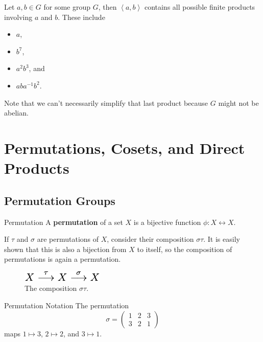 \documentclass[10pt]{report}
\begin{document}
\begin{ex}{}{}
	Let $a,b \in G$ for some group $G$, then $\left\langle a,b \right\rangle$ contains all possible finite products involving $a$ and $b$. These include
	\begin{itemize}
		\item $a$,
		\item $b^7$,
		\item $a^2 b^3$, and
		\item $a b a^{-1} b^2$.
	\end{itemize}
	Note that we can't necessarily simplify that last product because $G$ might not be abelian.
\end{ex}


\chapter{Permutations, Cosets, and Direct Products}


\section{Permutation Groups}

\begin{defn}{Permutation}{}
A \textbf{permutation} of a set $X$ is a bijective function $\phi:X \leftrightarrow X$.
\end{defn}

If $\tau$ and $\sigma$ are permutations of $X$, consider their composition $\sigma \tau$. It is easily shown that this is also a bijection from $X$ to itself, so the composition of permutations is again a permutation.

\begin{figure}[H]
	\centering
	\includegraphics[scale=1.2]{fig/permutation-composition.pdf}
	\caption{The composition $\sigma \tau$.}
\end{figure}

\begin{note}{Permutation Notation}{}
The permutation
\[
\sigma =
\begin{pmatrix}
	1 & 2 & 3 \\
	3 & 2 & 1
\end{pmatrix}
\] maps $1 \mapsto 3$, $2 \mapsto 2$, and $3 \mapsto 1$.
\end{note}
\end{document}
